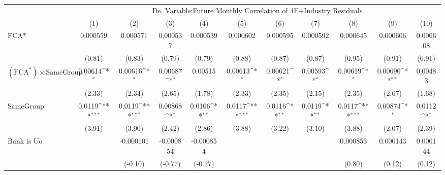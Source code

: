 {
\def\sym#1{\ifmmode^{#1}\else\(^{#1}\)\fi}
\begin{tabular}{l*{10}{c}}
\hline\hline
                &\multicolumn{10}{c}{De. Variable:Future Monthly Correlation of 4F+Industry Residuals}                                                                                                        \\\cmidrule(lr){2-11}
                &\multicolumn{1}{c}{(1)}         &\multicolumn{1}{c}{(2)}         &\multicolumn{1}{c}{(3)}         &\multicolumn{1}{c}{(4)}         &\multicolumn{1}{c}{(5)}         &\multicolumn{1}{c}{(6)}         &\multicolumn{1}{c}{(7)}         &\multicolumn{1}{c}{(8)}         &\multicolumn{1}{c}{(9)}         &\multicolumn{1}{c}{(10)}         \\
\hline
$ \text{FCA*} $ & 0.000559         & 0.000571         & 0.000537         & 0.000539         & 0.000602         & 0.000595         & 0.000592         & 0.000645         & 0.000606         & 0.000608         \\
                &   (0.81)         &   (0.83)         &   (0.79)         &   (0.79)         &   (0.88)         &   (0.87)         &   (0.87)         &   (0.95)         &   (0.91)         &   (0.91)         \\
[1em]
 $ (\text{FCA}^*) \times {\text{SameGroup} }  $ &  0.00614\sym{*}  &  0.00616\sym{*}  &  0.00687\sym{*}  &  0.00515         &  0.00613\sym{*}  &  0.00621\sym{*}  &  0.00593\sym{*}  &  0.00619\sym{*}  &  0.00690\sym{**} &  0.00483         \\
                &   (2.33)         &   (2.34)         &   (2.65)         &   (1.78)         &   (2.33)         &   (2.35)         &   (2.15)         &   (2.35)         &   (2.67)         &   (1.68)         \\
[1em]
SameGroup       &   0.0119\sym{***}&   0.0119\sym{***}&  0.00868\sym{*}  &   0.0106\sym{**} &   0.0117\sym{***}&   0.0116\sym{**} &   0.0119\sym{**} &   0.0117\sym{***}&  0.00874\sym{*}  &   0.0112\sym{*}  \\
                &   (3.91)         &   (3.90)         &   (2.42)         &   (2.86)         &   (3.88)         &   (3.22)         &   (3.10)         &   (3.88)         &   (2.07)         &   (2.39)         \\
[1em]
 $ \text{Bank is Uo}  $ &                  &-0.000101         &-0.000854         &-0.000854         &                  &                  &                  & 0.000853         & 0.000143         & 0.000144         \\
                &                  &  (-0.10)         &  (-0.77)         &  (-0.77)         &                  &                  &                  &   (0.80)         &   (0.12)         &   (0.12)         \\

\end{tabular}}
